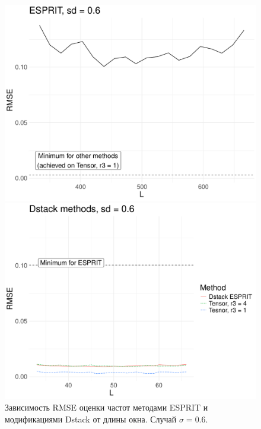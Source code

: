 \documentclass[specialist,
  substylefile=spbu_report.rtx,
subf,href,colorlinks=true, 12pt]{disser}
\theoremstyle{plain}
\theoremstyle{definition}
\theoremstyle{remark}
\begin{document}
\begin{figure}
  \begin{minipage}{0.48\textwidth}
    \centering
    \includegraphics[width=\textwidth]{htlsd_byL_real_param_rmse_esprit_3.pdf}
  \end{minipage}
  \begin{minipage}{0.48\textwidth}
    \centering
    \includegraphics[width=\textwidth]{htlsd_byL_real_param_rmse_dstack_3.pdf}
  \end{minipage}
  \caption{Зависимость RMSE оценки частот методами ESPRIT и
  модификациями Dstack от длины окна. Случай $\sigma = 0.6$.}
  \label{fig:dstack-esprit-byL-large}
\end{figure}
\end{document}

